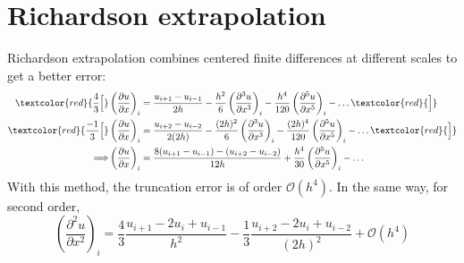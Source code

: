 \documentclass[12pt, openany]{report}
\theoremstyle{definition}
\begin{document}
\section{Richardson extrapolation}
Richardson extrapolation combines centered finite differences at different scales to get a better error:
\begin{equation}
	\begin{aligned}
		\textcolor{red}{\frac{4}{3}\Big [}&\left(\frac{\partial u}{\partial x}\right)_i = \frac{u_{i+1}-u_{i-1}}{2h} - \frac{h^2}{6}\left(\frac{\partial^3 u }{\partial x^3}\right)_i - \frac{h^4}{120}\left(\frac{\partial^5 u}{\partial x^5}\right)_i - \dots\textcolor{red}{\Big]}\\
		\textcolor{red}{\frac{-1}{3}\Big [}&\left(\frac{\partial u}{\partial x}\right)_i = \frac{u_{i+2}-u_{i-2}}{2(2h)} - \frac{(2h)^2}{6}\left(\frac{\partial^3 u }{\partial x^3}\right)_i - \frac{(2h)^4}{120}\left(\frac{\partial^5 u}{\partial x^5}\right)_i - \dots\textcolor{red}{\Big]}\\
		\Longrightarrow &\left(\frac{\partial u}{\partial x}\right)_i = \frac{8(u_{i+1}-u_{i-1})-(u_{i+2}-u_{i-2})}{12h} + \frac{h^4}{30}\left(\frac{\partial^5 u}{\partial x^5}\right)_i - \dots
	\end{aligned}
\end{equation}
With this method, the truncation error is of order $\mathcal{O}(h^4)$. In the same way, for second order,
\begin{equation}
	\left(\frac{\partial^2u}{\partial x^2}\right)_i = \frac{4}{3}\frac{u_{i+1}-2u_i+u_{i-1}}{h^2} - \frac{1}{3}\frac{u_{i+2}-2u_i+u_{i-2}}{(2h)^2} + \mathcal{O}(h^4)
\end{equation}
\end{document}
